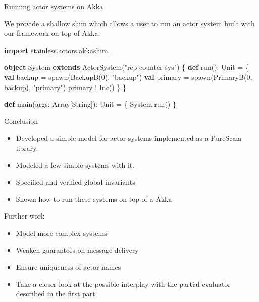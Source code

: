 \documentclass[ignorenonframetext,]{beamer}
\newenvironment{Shaded}{}{}
\newcommand{\DecValTok}[1]{\textcolor[rgb]{0.25,0.63,0.44}{#1}}
\newcommand{\FunctionTok}[1]{\textcolor[rgb]{0.02,0.16,0.49}{#1}}
\newcommand{\KeywordTok}[1]{\textcolor[rgb]{0.00,0.44,0.13}{\textbf{#1}}}
\newcommand{\NormalTok}[1]{#1}
\newcommand{\StringTok}[1]{\textcolor[rgb]{0.25,0.44,0.63}{#1}}
\providecommand{\tightlist}{%
  \setlength{\itemsep}{0pt}\setlength{\parskip}{0pt}}
\begin{document}
\begin{frame}[fragile]{%
\protect\hypertarget{running-actor-systems-on-akka}{%
Running actor systems on Akka}}

We provide a shallow shim which allows a user to run an actor system
built with our framework on top of Akka.

\begin{Shaded}
\begin{Highlighting}[]
\KeywordTok{import}\NormalTok{ stainless.}\FunctionTok{actors}\NormalTok{.}\FunctionTok{akkashim}\NormalTok{._}

\KeywordTok{object}\NormalTok{ System }\KeywordTok{extends} \FunctionTok{ActorSystem}\NormalTok{(}\StringTok{"rep-counter-sys"}\NormalTok{) \{}
  \KeywordTok{def} \FunctionTok{run}\NormalTok{(): Unit = \{}
    \KeywordTok{val}\NormalTok{ backup = }\FunctionTok{spawn}\NormalTok{(}\FunctionTok{BackupB}\NormalTok{(}\DecValTok{0}\NormalTok{), }\StringTok{"backup"}\NormalTok{)}
    \KeywordTok{val}\NormalTok{ primary = }\FunctionTok{spawn}\NormalTok{(}\FunctionTok{PrimaryB}\NormalTok{(}\DecValTok{0}\NormalTok{, backup), }\StringTok{"primary"}\NormalTok{)}
\NormalTok{    primary ! }\FunctionTok{Inc}\NormalTok{()}
\NormalTok{  \}}
\NormalTok{\}}

\KeywordTok{def} \FunctionTok{main}\NormalTok{(args: Array[String]): Unit = \{}
\NormalTok{  System.}\FunctionTok{run}\NormalTok{()}
\NormalTok{\}}
\end{Highlighting}
\end{Shaded}

\end{frame}

\begin{frame}{%
\protect\hypertarget{conclusion-1}{%
Conclusion}}

\begin{itemize}
\tightlist
\item
  Developed a simple model for actor systems implemented as a PureScala
  library.
\item
  Modeled a few simple systems with it.
\item
  Specified and verified global invariants
\item
  Shown how to run these systems on top of a Akka
\end{itemize}

\end{frame}

\begin{frame}{%
\protect\hypertarget{further-work-1}{%
Further work}}

\begin{itemize}
\tightlist
\item
  Model more complex systems
\item
  Weaken guarantees on message delivery
\item
  Ensure uniqueness of actor names
\item
  Take a closer look at the possible interplay with the partial
  evaluator described in the first part
\end{itemize}

\end{frame}
\end{document}
